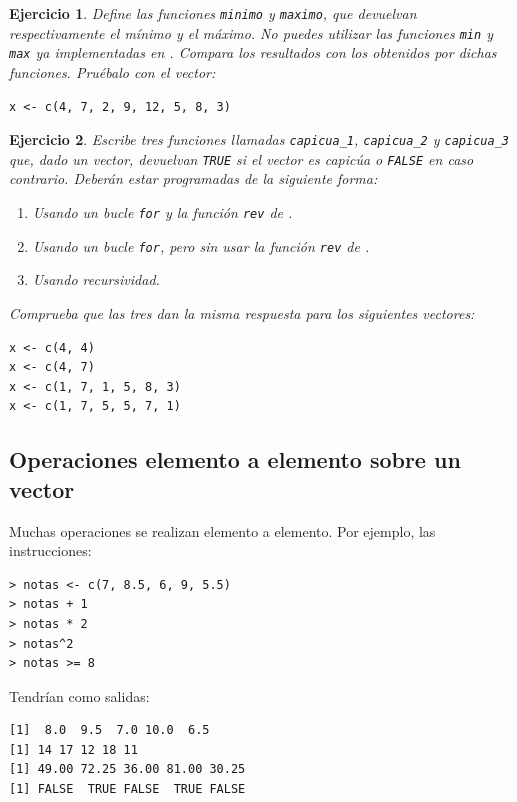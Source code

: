 \documentclass[11pt,a4paper]{article}
\newcommand{\R}{\textcolor{azuluc}{\faIcon{r-project}}}
\theoremstyle{exercise}
\newtheorem{exercise}{Ejercicio}
\begin{document}
\begin{exercise} Define las funciones \texttt{minimo} y \texttt{maximo}, que devuelvan respectivamente el mínimo y el máximo. No puedes utilizar las funciones \texttt{min} y \texttt{max} ya implementadas en \R. Compara los resultados con los obtenidos por dichas funciones. Pruébalo con el vector:
\begin{lstlisting}[style=rstyle]
x <- c(4, 7, 2, 9, 12, 5, 8, 3)
\end{lstlisting}
\end{exercise}


\begin{exercise} Escribe tres funciones llamadas \texttt{capicua\_1}, \texttt{capicua\_2} y \texttt{capicua\_3} que, dado un vector, devuelvan \texttt{TRUE} si el vector es capicúa o \texttt{FALSE} en caso contrario. Deberán estar programadas de la siguiente forma:
\begin{enumerate}
	\item Usando un bucle \texttt{for} y la función \texttt{rev} de \R.
	\item Usando un bucle \texttt{for}, pero sin usar la función \texttt{rev} de \R.
	\item Usando recursividad.
\end{enumerate}
Comprueba que las tres dan la misma respuesta para los siguientes vectores:
\begin{lstlisting}[style=rstyle]
x <- c(4, 4)
x <- c(4, 7)
x <- c(1, 7, 1, 5, 8, 3)
x <- c(1, 7, 5, 5, 7, 1)
\end{lstlisting}
\end{exercise}




\subsection{Operaciones elemento a elemento sobre un vector}


Muchas operaciones se realizan elemento a elemento. Por ejemplo, las instrucciones:
\begin{lstlisting}[style=rconsole]
> notas <- c(7, 8.5, 6, 9, 5.5)
> notas + 1
> notas * 2
> notas^2
> notas >= 8
\end{lstlisting}
Tendrían como salidas:

\begin{lstlisting}[style=routput]
[1]  8.0  9.5  7.0 10.0  6.5
[1] 14 17 12 18 11
[1] 49.00 72.25 36.00 81.00 30.25
[1] FALSE  TRUE FALSE  TRUE FALSE
\end{lstlisting}
\end{document}
